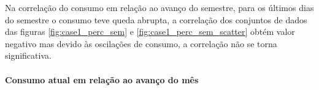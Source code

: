 \documentclass[	12pt, Times, openright, twoside, a4paper, english, brazil]{abntex2}
\begin{document}
    	            Na correlação do consumo em relação ao avanço do semestre, para os últimos dias do semestre o consumo teve queda abrupta, a correlação dos conjuntos de dados das figuras \ref{fig:case1_perc_sem} e \ref{fig:case1_perc_sem_scatter} obtém valor negativo mas devido às oscilações de consumo, a correlação não se torna significativa.
    	      
              \paragraph{Consumo atual em relação ao avanço do mês}
                
                {
                \begin{center} 
                    \begin{minipage}[c]{0.45\textwidth}
                        \begin{figure}[H]
                        \end{figure}
                    \end{minipage} \hfill %
                    

\end{center}}
\end{document}
